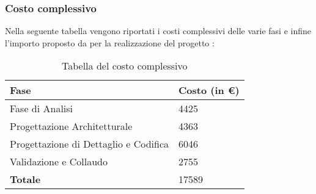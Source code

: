 \subsubsection{Costo complessivo}
Nella seguente tabella vengono riportati i costi complessivi delle varie fasi e infine l'importo proposto da \Gruppo{} per la realizzazione del progetto \NomeProgetto{}:\\
{
\renewcommand{\arraystretch}{2}
\begin{longtable}{ C{5cm} C{5cm}}
\caption{Tabella del costo complessivo}\\
\rowcolor{\primaryColor}

\textcolor{\secondaryColor}{\textbf{Fase}} &
\textcolor{\secondaryColor}{\textbf{Costo  (in \euro{})}}\\	
\endhead

Fase di Analisi						  &  4425 \\
Progettazione Architetturale          &  4363 \\
Progettazione di Dettaglio e Codifica & 6046  \\
Validazione e Collaudo                &  2755 \\
\textbf{Totale}                       &  17589 \\

\end{longtable}
}